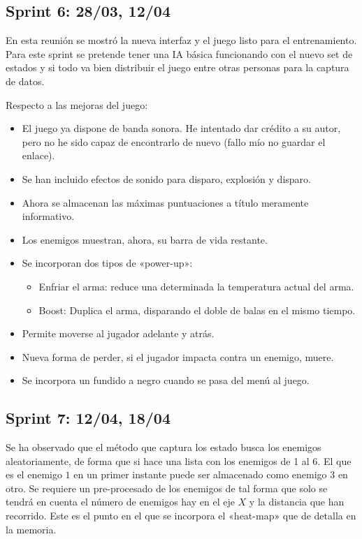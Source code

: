 \subsection{Sprint 6:  28/03, 12/04}

En esta reunión se mostró la nueva interfaz y el juego listo para el entrenamiento. Para este sprint se pretende tener una IA básica funcionando con el nuevo set de estados y si todo va bien distribuir el juego entre otras personas para la captura de datos.

Respecto a las mejoras del juego:
\begin{itemize}
    \item El juego ya dispone de banda sonora. He intentado dar crédito a su autor, pero no he sido capaz de encontrarlo de nuevo (fallo mío no guardar el enlace).
    \item Se han incluido efectos de sonido para disparo, explosión y disparo.
    \item Ahora se almacenan las máximas puntuaciones a título meramente informativo.
    \item Los enemigos muestran, ahora, su barra de vida restante.
    \item Se incorporan dos tipos de «power-up»:
    \begin{itemize}
        \item Enfriar el arma: reduce una determinada la temperatura actual del arma.
        \item Boost: Duplica el arma, disparando el doble de balas en el mismo tiempo.
    \end{itemize}
    \item Permite moverse al jugador adelante y atrás.
    \item Nueva forma de perder, si el jugador impacta contra un enemigo, muere.
    \item Se incorpora un fundido a negro cuando se pasa del menú al juego.
\end{itemize}



\subsection{Sprint 7:  12/04, 18/04}

Se ha observado que el método que captura los estado busca los enemigos aleatoriamente, de forma que si hace una lista con los enemigos de 1 al 6. El que es el enemigo $1$ en un primer instante puede ser almacenado como enemigo $3$ en otro. Se requiere un pre-procesado de los enemigos de tal forma que solo se tendrá en cuenta el número de enemigos hay en el eje $X$ y la distancia que han recorrido. Este es el punto en el que se incorpora el «heat-map» que de detalla en la memoria.

